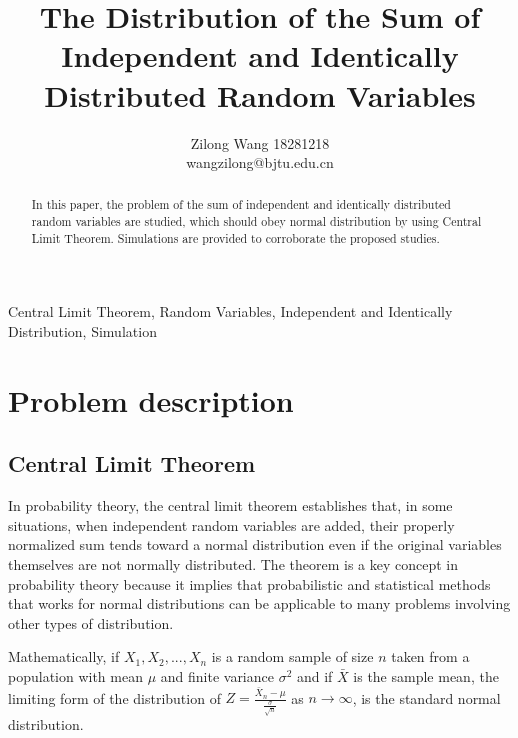 \documentclass[conference]{IEEEtran}
\begin{document}
\title{The Distribution of the Sum of Independent and Identically Distributed Random Variables}
\author{Zilong Wang 18281218\\wangzilong@bjtu.edu.cn

 }


\maketitle
\begin{abstract}
In this paper, the problem of the sum of independent and identically distributed random variables are studied, which should obey normal distribution by using Central Limit Theorem. Simulations are provided to corroborate the proposed studies.
\end{abstract}

\begin{IEEEkeywords}
Central Limit Theorem, Random Variables, Independent and Identically Distribution, Simulation
\end{IEEEkeywords}



\section{Problem description}
\subsection{Central Limit Theorem\cite{b1}}
In probability theory, the central limit theorem establishes that, in some situations, when independent random variables are added, their properly normalized sum tends toward a normal distribution even if the original variables themselves are not normally distributed. The theorem is a key concept in probability theory because it implies that probabilistic and statistical methods that works for normal distributions can be applicable to many problems involving other types of distribution.

Mathematically, if $X_1, X_2, ..., X_n$ is a random sample of size $n$ taken from a population with mean $\mu$ and finite variance $\sigma^2$ and if $\bar{X}$ is the sample mean, the limiting form of the distribution of $Z=\frac{\bar{X}_n-\mu}{\frac{\sigma}{\sqrt{n}}}$ as $n\to \infty$, is the standard normal distribution.
\end{document}
